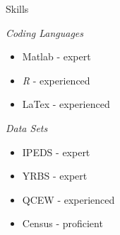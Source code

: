 \documentclass{resume}
\begin{document}
\begin{rSection}{Skills}
 \begin{minipage}[t]{.5\textwidth}

     \emph{ \large Coding Languages}

      \vspace{1ex}
     \begin{itemize}
         \item Matlab - expert
         \item \textit{R} - experienced
         \item LaTex - experienced
         
          \end{itemize}

 \end{minipage}\hfil
  \begin{minipage}[t]{.5\textwidth}

     \emph{\large Data Sets}

      \vspace{1ex}
     \begin{itemize}
         \item IPEDS - expert
         \item YRBS - expert
         \item QCEW - experienced
         \item Census - proficient
         
         
          \end{itemize}

 \end{minipage}
\end{rSection}
\end{document}
